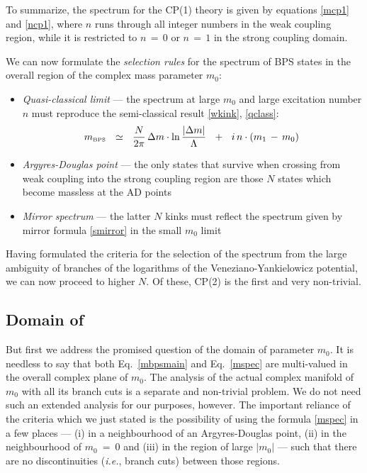 \documentclass[epsfig,12pt]{article}
\def\beq{\begin{equation}}
\def\eeq{\end{equation}}
\def\beq{\begin{equation}}
\def\eeq{\end{equation}}
\newcommand{\mbps}{m_{\text{\tiny BPS}}}
\begin{document}
	To summarize, the spectrum for the CP(1) theory is given by equations \eqref{mcp1} and \eqref{ncp1},
	where $ n $ runs through all integer numbers in the weak coupling region, while it is restricted
	to $ n \,=\, 0 $ or $ n \,=\, 1 $ in the strong coupling domain.

\vspace{0.7cm}
\centerline{\bf*\qquad\qquad\quad*\qquad\qquad\quad*}
\vspace{0.4cm}

	We can now formulate the {\it selection rules} for the spectrum of BPS states in the overall
	region of the complex mass parameter $ m_0 $:
\begin{itemize}
\item
	{\it Quasi-classical limit} --- the spectrum at large $ m_0 $ and large excitation number $ n $
	must reproduce the semi-classical result \eqref{wkink}, \eqref{qclass}:
\beq
\label{climit}
\mbps ~~\simeq~~ \frac{N}{2\pi}\,
		\Delta m \cdot \ln \frac{|\Delta m|}{\Lambda}  
	    ~~+~~
	i\, n \cdot ( m_1 \,-\, m_0 )\,
\eeq

\item
	{\it Argyres-Douglas point} --- the only states that survive when crossing from weak coupling 
	into the strong coupling region are those $ N $ states which become massless at the AD points

\item
	{\it Mirror spectrum} --- the latter $ N $ kinks must reflect the spectrum given by mirror 
	formula \eqref{smirror} in the small $ m_0 $ limit 
\end{itemize}

	Having formulated the criteria for the selection of the spectrum from the 
	large ambiguity of branches of the logarithms of the Veneziano-Yankielowicz potential,
	we can now proceed to higher $ N $.
	Of these, CP(2) is the first and very non-trivial.

\subsection{Domain of }

	But first we address the promised question of the domain of parameter $ m_0 $.
	It is needless to say that both Eq.~\eqref{mbpsmain} and Eq.~\eqref{mspec} 
	are multi-valued in the overall complex plane of $ m_0 $.
	The analysis of the actual complex manifold of $ m_0 $ with all its branch cuts
	is a separate and non-trivial problem.
	We do not need such an extended analysis for our purposes, however.
	The important reliance of the criteria which we just stated is the possibility of 
	using the formula \eqref{mspec} in a few places --- (i) in a neighbourhood of an Argyres-Douglas point,
	(ii) in the neighbourhood of $ m_0 ~=~ 0 $ and (iii) in the region of large $ |m_0| $ ---
	such that there are no discontinuities ({\it i.e.}, branch cuts) between those regions.
\end{document}
